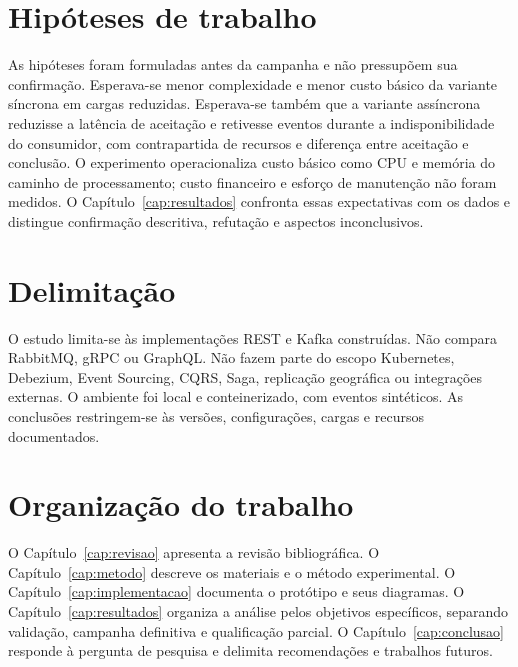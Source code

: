 \section{Hipóteses de trabalho}

As hipóteses foram formuladas antes da campanha e não pressupõem sua confirmação. Esperava-se menor complexidade e menor custo básico da variante síncrona em cargas reduzidas. Esperava-se também que a variante assíncrona reduzisse a latência de aceitação e retivesse eventos durante a indisponibilidade do consumidor, com contrapartida de recursos e diferença entre aceitação e conclusão. O experimento operacionaliza custo básico como CPU e memória do caminho de processamento; custo financeiro e esforço de manutenção não foram medidos. O Capítulo~\ref{cap:resultados} confronta essas expectativas com os dados e distingue confirmação descritiva, refutação e aspectos inconclusivos.

\section{Delimitação}

O estudo limita-se às implementações REST e Kafka construídas. Não compara RabbitMQ, gRPC ou GraphQL. Não fazem parte do escopo Kubernetes, Debezium, Event Sourcing, CQRS, Saga, replicação geográfica ou integrações externas. O ambiente foi local e conteinerizado, com eventos sintéticos. As conclusões restringem-se às versões, configurações, cargas e recursos documentados.

\section{Organização do trabalho}

O Capítulo~\ref{cap:revisao} apresenta a revisão bibliográfica. O Capítulo~\ref{cap:metodo} descreve os materiais e o método experimental. O Capítulo~\ref{cap:implementacao} documenta o protótipo e seus diagramas. O Capítulo~\ref{cap:resultados} organiza a análise pelos objetivos específicos, separando validação, campanha definitiva e qualificação parcial. O Capítulo~\ref{cap:conclusao} responde à pergunta de pesquisa e delimita recomendações e trabalhos futuros.
